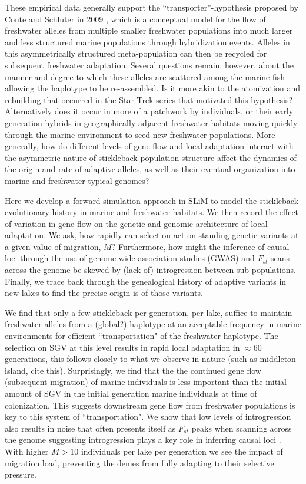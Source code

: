 \documentclass{article}
\begin{document}
These empirical data generally support the ``transporter''-hypothesis proposed by Conte and Schluter in 2009 \citet{schluter2009genetics}, 
which is a conceptual model for the flow of freshwater alleles from multiple smaller freshwater populations into much larger and less structured marine populations through hybridization events. 
Alleles in this asymmetrically structured meta-population can then be recycled for subsequent freshwater adaptation. 
Several questions remain, however, about the manner and degree to which these alleles are scattered among the marine fish allowing the haplotype to be re-assembled. 
Is it more akin to the atomization and rebuilding that occurred in the Star Trek series that motivated this hypothesis? 
Alternatively does it occur in more of a patchwork by individuals, 
or their early generation hybrids in geographically adjacent freshwater habitats moving quickly through the marine environment to seed new freshwater populations. 
More generally, how do different levels of gene flow and local adaptation interact with the asymmetric nature of stickleback population structure affect the dynamics of the origin and rate of adaptive alleles, 
as well as their eventual organization into marine and freshwater typical genomes? 

Here we develop a forward simulation approach in SLiM to model the stickleback evolutionary history in marine and freshwater habitats.
We then record the effect of variation in gene flow on the genetic and genomic architecture of local adaptation.
We ask, how rapidly can selection act on standing genetic variants at a given value of migration, $M$?
Furthermore, how might the inference of causal loci through the use of genome wide association studies (GWAS) and $F_{st}$ scans across the genome be skewed by (lack of) introgression between sub-populations. 
Finally, we trace back through the genealogical history of adaptive variants in new lakes to find the precise origin is of those variants.

We find that only a few stickleback per generation, per lake, 
suffice to maintain freshwater alleles from a (global?) haplotype at an acceptable frequency in marine environments for efficient ``transportation" of the freshwater haplotype.
The selection on SGV at this level results in rapid local adaptation in $\approx 60$ generations, this follows closely to what we observe in nature (such as middleton island, cite this).
Surprisingly, we find that the the continued gene flow (subsequent migration) of marine individuals is less important than the initial amount of SGV in the initial generation marine individuals at time of colonization.
This suggests downstream gene flow from freshwater populations is key to this system of ``transportation".
We show that low levels of introgression also results in noise that often presents itself as $F_{st}$ peaks when scanning across the genome suggesting introgression plays a key role in inferring causal loci . 
With higher $M > 10$ individuals per lake per generation we see the impact of migration load, preventing the demes from fully adapting to their selective pressure.
\end{document}
